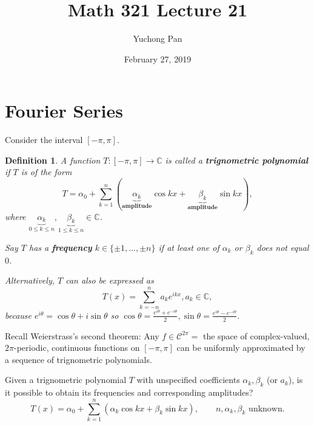 \documentclass[letterpaper, reqno,11pt]{article}
\newcommand{\CC}{\mathbb{C}}
\begin{document}
\title{Math 321 Lecture 21}
\author{Yuchong Pan}
\date{February 27, 2019}
\newtheorem{thm}{Theorem}
\newtheorem{defn}{Definition}
\newtheorem*{remark}{Remark}
\newtheorem{claim}{Claim}
\newtheorem{cor}{Corollary}
\newtheorem{lemma}{Lemma}
\newtheorem{prop}{Proposition}
\newtheorem{fact}{Fact}
\maketitle
%

\section{Fourier Series}

Consider the interval $[-\pi, \pi]$.

\begin{defn}
  \normalfont A function $T : [-\pi, \pi] \to \CC$ is called a {\bf trignometric polynomial} if $T$ is of the form
  \[ T = \alpha_0 + \sum_{k = 1}^n \left(\underbrace{\alpha_k}_\textbf{amplitude} \cos kx + \underbrace{\beta_k}_\textbf{amplitude} \sin kx\right), \]
  where $\underbrace{\alpha_k}_{0 \leq k \leq n}, \underbrace{\beta_k}_{1 \leq k \leq n} \in \CC$.

  Say $T$ has a {\bf frequency} $k \in \{ \pm 1, \ldots, \pm n \}$ if at least one of $\alpha_k$ or $\beta_k$ does not equal $0$.

  Alternatively, $T$ can also be expressed as
  \begin{equation} \label{eq:*} \tag{*}
    T(x) = \sum_{k = -n}^n a_k e^{ikx}, a_k \in \CC,
  \end{equation}
  because $e^{i\theta} = \cos \theta + i\sin \theta$ so $\cos\theta = \frac{e^{i\theta} + e^{-i\theta}}{2}, \sin\theta = \frac{e^{i\theta} - e^{-i\theta}}{2}$.
\end{defn}

Recall Weierstrass's second theorem: Any $f \in \mathcal C^{2\pi} =$ the space of complex-valued, $2\pi$-periodic, continuous functions on $[-\pi, \pi]$ can be uniformly approximated by a sequence of trignometric polynomials.

\medskip

 Given a trignometric polynomial $T$ with unspecified coefficients $\alpha_k, \beta_k$ (or $a_k$), is it possible to obtain its frequencies and corresponding amplitudes?
\[ T(x) = \alpha_0 + \sum_{k = 1}^n (\alpha_k \cos kx + \beta_k \sin kx), \qquad \text{$n, \alpha_k, \beta_k$ unknown}. \]
\end{document}
